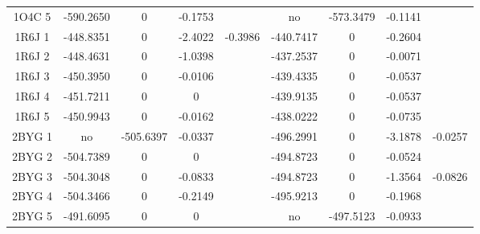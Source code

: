 \documentclass[a4paper,12pt]{article}
\begin{document}
\begin{table}[h]
\begin{tabular}{|c|c|c|c|c|c|c|c|c|}
        1O4C 5 & -590.2650 & 0 & -0.1753 & &                  no & -573.3479 & -0.1141 & \\           
        1R6J 1 & -448.8351 & 0 & -2.4022 & -0.3986 &          -440.7417 & 0 & -0.2604 & \\            
        1R6J 2 & -448.4631 & 0 & -1.0398 & &                  -437.2537 & 0 & -0.0071 & \\            
        1R6J 3 & -450.3950 & 0 & -0.0106 & &                  -439.4335 & 0 & -0.0537 & \\            
        1R6J 4 & -451.7211 & 0 & 0 & &                        -439.9135 & 0 & -0.0537 & \\            
        1R6J 5 & -450.9943 & 0 & -0.0162 & &                  -438.0222 & 0 & -0.0735 & \\            
        2BYG 1 & no & -505.6397 & -0.0337 & &                  -496.2991 & 0 & -3.1878 & -0.0257 \\    
        2BYG 2 & -504.7389 & 0 & 0 & &                        -494.8723 & 0 & -0.0524 & \\            
        2BYG 3 & -504.3048 & 0 & -0.0833 & &                  -494.8723 & 0 & -1.3564 & -0.0826\\     
        2BYG 4 & -504.3466 & 0 & -0.2149 & &                  -495.9213 & 0 & -0.1968 & \\            
        2BYG 5 & -491.6095 & 0 & 0 & &                        no & -497.5123 & -0.0933 & \\           
        
        \hline


 \end{tabular}      
 \label{tab_echec_10_20}      
\end{table}
\end{document}
